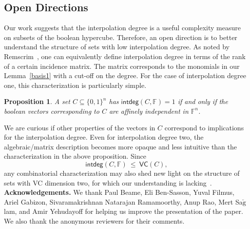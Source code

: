 \documentclass[11pt]{article}
\newtheorem{proposition}[theorem]{Proposition}
\theoremstyle{definition}
\newcommand{\1}{\mathbf{1}}
\newcommand{\F}{{\mathbb F}}
\renewcommand{\leq}{\leqslant}
\newcommand{\vc}{\mathsf{VC}}
\newcommand{\intdeg}{\mathsf{intdeg}}
\newcommand{\bitsz}{\{0,1\}^n}
\begin{document}
\subsection{Open Directions}
Our work suggests that the interpolation degree is a useful complexity measure on subsets of the boolean hypercube.  Therefore, an open direction is to better understand the structure of sets with low interpolation degree.  As noted by Remscrim~\cite{remscrim}, one can equivalently define interpolation degree in terms of the rank of a certain incidence matrix.  The matrix corresponds to the monomials in our Lemma~\ref{basis1} with a cut-off on the degree.  For the case of interpolation degree one, this characterization is particularly simple. 
\begin{proposition}  
A set $C\subseteq \bitsz$ has $\intdeg(C,\F) = 1$ if and only if the boolean vectors corresponding to $C$ are affinely independent in $\F^n$.
\end{proposition}

We are curious if other properties of the vectors in $C$ correspond to implications for the interpolation degree.  Even for interpolation degree two, the algebraic/matrix description becomes more opaque and less intuitive than the characterization in the above proposition.   Since \[\intdeg(C,\F)~\leq~\vc(C),\] any combinatorial characterization may also shed new  light on the structure of sets with VC dimension two, for which our understanding is lacking~\cite{AlonMY14,MoranSWY15}.\\

\noindent
{\bf Acknowledgements.} 
We thank Paul Beame, Eli Ben-Sasson, Yuval Filmus, Ariel Gabizon, Sivaramakrishnan Natarajan Ramamoorthy, Anup Rao, Mert Sa$\mathrm{\breve{g}}$lam, and Amir Yehudayoff for helping us improve the presentation of the paper.
We also thank the anonymous reviewers for their comments.
\end{document}
